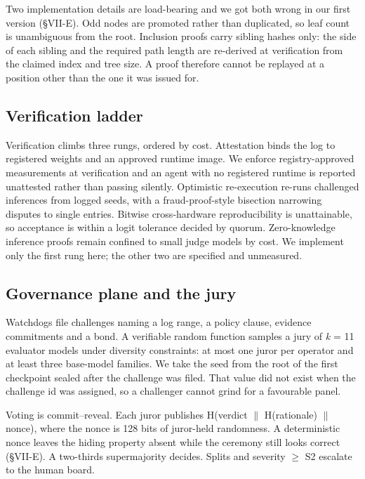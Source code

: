 \documentclass[conference]{IEEEtran}
\begin{document}
Two implementation details are load-bearing and we got both wrong in our first version (\S{}VII-E). Odd nodes are promoted rather than duplicated, so leaf count is unambiguous from the root. Inclusion proofs carry sibling hashes only: the side of each sibling and the required path length are re-derived at verification from the claimed index and tree size. A proof therefore cannot be replayed at a position other than the one it was issued for.

\subsection{Verification ladder}

Verification climbs three rungs, ordered by cost. Attestation binds the log to registered weights and an approved runtime image. We enforce registry-approved measurements at verification and an agent with no registered runtime is reported unattested rather than passing silently. Optimistic re-execution re-runs challenged inferences from logged seeds, with a fraud-proof-style bisection \cite{r6} narrowing disputes to single entries. Bitwise cross-hardware reproducibility is unattainable, so acceptance is within a logit tolerance decided by quorum. Zero-knowledge inference proofs \cite{r5} remain confined to small judge models by cost. We implement only the first rung here; the other two are specified and unmeasured.

\subsection{Governance plane and the jury}

Watchdogs file challenges naming a log range, a policy clause, evidence commitments and a bond. A verifiable random function samples a jury of \textit{k} = 11 evaluator models under diversity constraints: at most one juror per operator and at least three base-model families. We take the seed from the root of the first checkpoint sealed after the challenge was filed. That value did not exist when the challenge id was assigned, so a challenger cannot grind for a favourable panel.

Voting is commit--reveal. Each juror publishes H(verdict $\|$ H(rationale) $\|$ nonce), where the nonce is 128 bits of juror-held randomness. A deterministic nonce leaves the hiding property absent while the ceremony still looks correct (\S{}VII-E). A two-thirds supermajority decides. Splits and severity $\geq$ S2 escalate to the human board.
\end{document}
